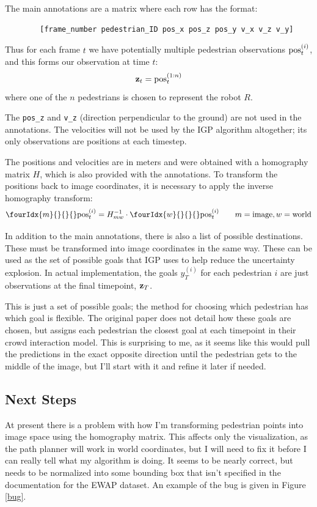 \documentclass[a4paper,11pt,headings=small]{article}
\begin{document}
The main annotations are a matrix where each row has the format:
\begin{verbatim}
        [frame_number pedestrian_ID pos_x pos_z pos_y v_x v_z v_y]
\end{verbatim}

Thus for each frame $t$ we have potentially multiple pedestrian observations $\mathrm{pos}^{(i)}_t$, and this forms our observation at time $t$:
$$ \mathbf{z}_t = \mathrm{pos}^{(1:n)}_t $$
where one of the $n$ pedestrians is chosen to represent the robot $R$.

The \texttt{pos\_z} and \texttt{v\_z} (direction perpendicular to the ground) are not used in the annotations. The velocities will not be used by the IGP algorithm altogether; its only observations are positions at each timestep.

The positions and velocities are in meters and were obtained with a homography matrix $H$, which is also provided with the annotations. To transform the positions back to image coordinates, it is necessary to apply the inverse homography transform:
$$ \fourIdx{m}{}{}{}\post = H_{mw}^{-1} \cdot \fourIdx{w}{}{}{}\post \qquad m = \mathrm{image}, w = \mathrm{world} $$

In addition to the main annotations, there is also a list of possible destinations. These must be transformed into image coordinates in the same way. These can be used as the set of possible goals that IGP uses to help reduce the uncertainty explosion. In actual implementation, the goals $y^{(i)}_T$ for each pedestrian $i$ are just observations at the final timepoint, $\mathbf{z}_T$.

This is just a set of possible goals; the method for choosing which pedestrian has which goal is flexible. The original paper does not detail how these goals are chosen, but \cite{Pellegrini2009} assigns each pedestrian the closest goal at each timepoint in their crowd interaction model. This is surprising to me, as it seems like this would pull the predictions in the exact opposite direction until the pedestrian gets to the middle of the image, but I'll start with it and refine it later if needed.

\subsection*{Next Steps}
\quad At present there is a problem with how I'm transforming pedestrian points into image space using the homography matrix. This affects only the visualization, as the path planner will work in world coordinates, but I will need to fix it before I can really tell what my algorithm is doing. It seems to be nearly correct, but needs to be normalized into some bounding box that isn't specified in the documentation for the EWAP dataset. An example of the bug is given in Figure \ref{bug}.
\end{document}
